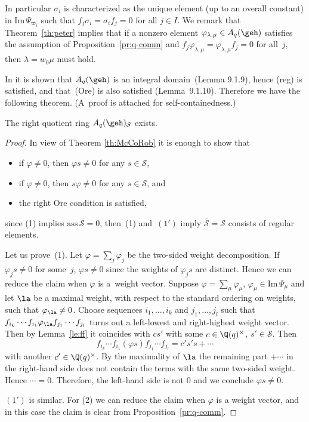 In particular
$\sigma_i$ is characterized as the unique element (up to an overall constant)
in $\mathrm{Im}\, \Psi_{\varpi_i}$ such that
$f_j \sigma_i = \sigma_i f_j = 0$ for all $j \in I$.
We remark that Theorem~\ref{th:peter} implies that
if a nonzero element $\varphi_{\lambda,\mu} \in A_q(\geh)$
satisf\/ies the assumption of Proposition~\ref{pr:q-comm} and
$f_j \varphi_{\lambda,\mu}
= \varphi_{\lambda,\mu} f_j = 0$ for all~$j$,
then $\lambda = w_0\mu$ must hold.

In \cite{Joseph} it is shown that $A_q(\geh)$ is an integral domain~(Lemma 9.1.9), hence (reg) is
satisf\/ied, and that~(Ore) is also satisf\/ied (Lemma~9.1.10). Therefore we have the following theorem.
(A~proof is attached for self-containedness.)

\begin{theorem}\label{th:quotient}
The right quotient ring $A_q(\geh)_\mathcal{S}$ exists.
\end{theorem}

\begin{proof}
In view of Theorem \ref{th:McCoRob} it is enough to show that
\begin{itemize}\itemsep=0pt
\item[(1)] if $\varphi\ne0$, then $\varphi s\ne0$ for any $s\in\mathcal{S}$,
\item[$(1')$] if $\varphi\ne0$, then $s\varphi\ne0$ for any $s\in\mathcal{S}$, and
\item[(2)] the right Ore condition is satisf\/ied,
\end{itemize}
since (1) implies $\mathrm{ass}\,\mathcal{S}=0$, then~(1) and~$(1')$ imply $\overline{\mathcal{S}}=
\mathcal{S}$ consists of regular elements.

Let us prove~(1). Let $\varphi=\sum_j\varphi_j$ be the two-sided weight decomposition.
If $\varphi_js\ne0$ for some~$j$,
$\varphi s\ne0$ since the weights of $\varphi_js$ are distinct.
Hence we can reduce the claim when $\varphi$ is a~weight vector.
Suppose $\varphi=\sum_\mu\varphi_\mu$, $\varphi_\mu\in\mathrm{Im}\,\Psi_\mu$ and let $\la$ be a maximal
weight, with respect to the standard ordering on weights, such that $\varphi_\la\ne0$. Choose sequences
$i_1,\ldots,i_k$ and $j_1,\ldots,j_l$ such that
$f_{i_k}\cdots f_{i_1}\varphi_\la f_{j_1}\cdots f_{j_l}$
turns out a left-lowest and right-highest weight vector.
Then by Lemma~\ref{le:ff} it coincides with $cs'$
with some $c\in\Q(q)^\times$, $s'\in\mathcal{S}$. Then
\[
f_{i_k}\cdots f_{i_1}(\varphi s)f_{j_1}\cdots f_{j_l}=c's's+\cdots
\]
with another $c'\in\Q(q)^\times$. By the maximality of $\la$ the remaining part $+\cdots$ in the right-hand
side does not contain
the terms with the same two-sided weight. Hence $\cdots=0$.
Therefore, the left-hand side is
not $0$ and we conclude $\varphi s\ne0$.

$(1')$ is similar.
For (2) we can reduce the claim when $\varphi$ is a weight vector, and in this case the claim is clear from
Proposition~\ref{pr:q-comm}.
\end{proof}

